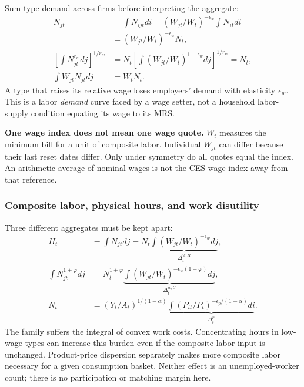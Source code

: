 Sum type demand across firms before interpreting the aggregate:
\begin{align}
 N_{jt}&=\int N_{ijt}di
       =(W_{jt}/W_t)^{-\epsilon_w}\int N_{it}di\\
       &=(W_{jt}/W_t)^{-\epsilon_w}N_t,\\
 \left[\int N_{jt}^{r_w}dj\right]^{1/r_w}
 &=N_t\left[\int(W_{jt}/W_t)^{1-\epsilon_w}dj\right]^{1/r_w}=N_t,\\
 \int W_{jt}N_{jt}dj&=W_tN_t.
\end{align}
A type that raises its relative wage loses employers' demand with elasticity
$\epsilon_w$. This is a labor \emph{demand} curve faced by a wage setter,
not a household labor-supply condition equating its wage to its MRS.

\begin{blueblock}
\textbf{One wage index does not mean one wage quote.}
$W_t$ measures the minimum bill for a unit of composite labor. Individual
$W_{jt}$ can differ because their last reset dates differ. Only under symmetry
do all quotes equal the index. An arithmetic average of nominal wages is not
the CES wage index away from that reference.
\end{blueblock}

\subsubsection{Composite labor, physical hours, and work disutility}

Three different aggregates must be kept apart:
\begin{align}
 H_t&=\int N_{jt}dj
    =N_t\underbrace{\int(W_{jt}/W_t)^{-\epsilon_w}dj}_{\Delta_t^{w,H}},\\
 \int N_{jt}^{1+\varphi}dj
 &=N_t^{1+\varphi}
       \underbrace{\int(W_{jt}/W_t)^{-\epsilon_w(1+\varphi)}dj}_{\Delta_t^{w,U}},\\
 N_t&=(Y_t/A_t)^{1/(1-\alpha)}
       \underbrace{\int(P_{it}/P_t)^{-\epsilon_p/(1-\alpha)}di}_{\Delta_t^p}.
 \label{eq:sw-dispersion}
\end{align}
The family suffers the integral of convex work costs. Concentrating hours
in low-wage types can increase this burden even if the composite labor input
is unchanged. Product-price dispersion separately makes more composite labor
necessary for a given consumption basket. Neither effect is an unemployed-worker
count; there is no participation or matching margin here.

